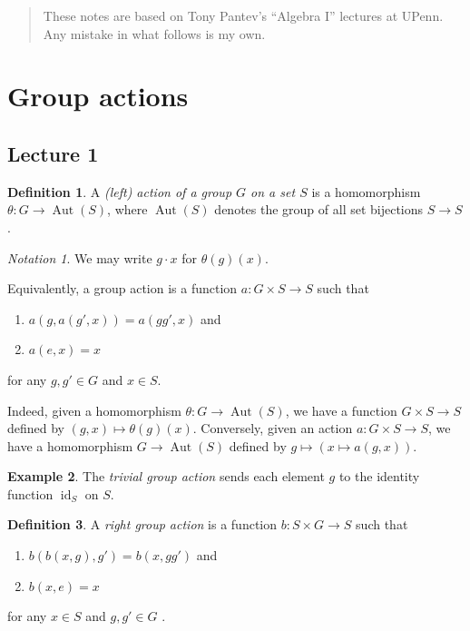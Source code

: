 \documentclass[10pt,letterpaper,cm]{nupset}
\theoremstyle{definition}
\newtheorem{definition}{Definition}[subsection]
\newtheorem{exmp}[definition]{Example}
\theoremstyle{theorem}
\theoremstyle{remark}
\newtheorem*{notation}{Notation}
\newcommand{\1}{\mathbf{1}}
\newcommand{\0}{\vec 0}
\DeclareMathOperator{\id}{\mathrm{id}}
\DeclareMathOperator{\aut}{Aut}
\begin{document}
\thispagestyle{empty}
\begin{abstract}
These notes are based on Tony Pantev's ``Algebra I'' lectures at UPenn. Any mistake in what follows is my own.
\end{abstract}

\tableofcontents
\newpage

\section{Group actions}

\subsection{Lecture 1}

\begin{definition} 
A \textit{(left) action of a group $G$ on a set $S$} is a homomorphism $\theta : G \to \aut(S)$, where $ \aut(S)$ denotes the group of all set bijections $S\to S$. 

\begin{notation}
We may write $g\cdot x$ for $\theta(g)(x)$.
\end{notation}

\smallskip

Equivalently, a group action is a function $a : G \times S \to S$ such that 
\begin{enumerate}[label=(\roman*)]
\item $a(g, a(g', x)) = a(gg', x)$ and
\item $a(e, x) = x$
\end{enumerate}
for any $g,g' \in G$ and $x\in S$. 
\end{definition}

Indeed, given a homomorphism $\theta : G \to \aut(S)$, we have a function $G\times S \to S$ defined by  $\left(g, x\right) \mapsto \theta(g)(x)$. Conversely, given an action $a : G\times S \to S$, we have a homomorphism $G \to \aut(S)$ defined by $g \mapsto \left(x \mapsto a(g, x)\right)$.


\begin{exmp}
The \textit{trivial group action} sends each element $g$ to the identity function $\id_S$ on $S$.
\end{exmp}

\smallskip

\begin{definition}
A \textit{right group action} is a function $b: S \times G \to S$ such that 
\begin{enumerate}[label=(\roman*)]
\item $b(b(x, g), g') = b(x, gg')$ and
\item $b(x, e) = x$
\end{enumerate}
for any $x\in S$ and $g,g' \in G$ . 
\end{definition}
\end{document}
